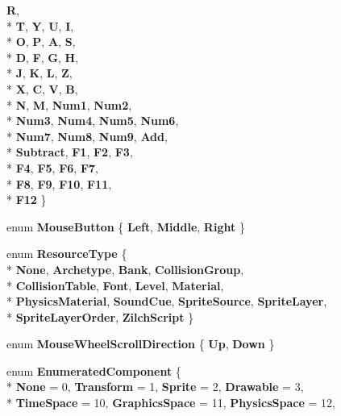 \begin{DoxyCompactItemize}
{\bfseries R}, 
\\*
{\bfseries T}, 
{\bfseries Y}, 
{\bfseries U}, 
{\bfseries I}, 
\\*
{\bfseries O}, 
{\bfseries P}, 
{\bfseries A}, 
{\bfseries S}, 
\\*
{\bfseries D}, 
{\bfseries F}, 
{\bfseries G}, 
{\bfseries H}, 
\\*
{\bfseries J}, 
{\bfseries K}, 
{\bfseries L}, 
{\bfseries Z}, 
\\*
{\bfseries X}, 
{\bfseries C}, 
{\bfseries V}, 
{\bfseries B}, 
\\*
{\bfseries N}, 
{\bfseries M}, 
{\bfseries Num1}, 
{\bfseries Num2}, 
\\*
{\bfseries Num3}, 
{\bfseries Num4}, 
{\bfseries Num5}, 
{\bfseries Num6}, 
\\*
{\bfseries Num7}, 
{\bfseries Num8}, 
{\bfseries Num9}, 
{\bfseries Add}, 
\\*
{\bfseries Subtract}, 
{\bfseries F1}, 
{\bfseries F2}, 
{\bfseries F3}, 
\\*
{\bfseries F4}, 
{\bfseries F5}, 
{\bfseries F6}, 
{\bfseries F7}, 
\\*
{\bfseries F8}, 
{\bfseries F9}, 
{\bfseries F10}, 
{\bfseries F11}, 
\\*
{\bfseries F12}
 \}
\item 
enum {\bfseries Mouse\-Button} \{ {\bfseries Left}, 
{\bfseries Middle}, 
{\bfseries Right}
 \}
\item 
enum {\bfseries Resource\-Type} \{ \\*
{\bfseries None}, 
{\bfseries Archetype}, 
{\bfseries Bank}, 
{\bfseries Collision\-Group}, 
\\*
{\bfseries Collision\-Table}, 
{\bfseries Font}, 
{\bfseries Level}, 
{\bfseries Material}, 
\\*
{\bfseries Physics\-Material}, 
{\bfseries Sound\-Cue}, 
{\bfseries Sprite\-Source}, 
{\bfseries Sprite\-Layer}, 
\\*
{\bfseries Sprite\-Layer\-Order}, 
{\bfseries Zilch\-Script}
 \}
\item 
enum {\bfseries Mouse\-Wheel\-Scroll\-Direction} \{ {\bfseries Up}, 
{\bfseries Down}
 \}
\item 
enum {\bfseries Enumerated\-Component} \{ \\*
{\bfseries None} = 0, 
{\bfseries Transform} = 1, 
{\bfseries Sprite} = 2, 
{\bfseries Drawable} = 3, 
\\*
{\bfseries Time\-Space} = 10, 
{\bfseries Graphics\-Space} = 11, 
{\bfseries Physics\-Space} = 12, 

\end{DoxyCompactItemize}
